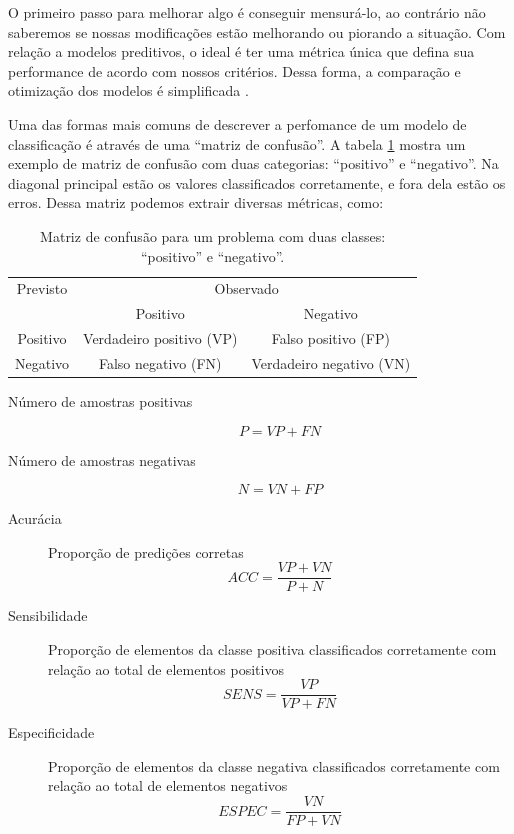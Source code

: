 \documentclass[a4paper,titlepage]{ppgi}\usepackage[]{graphicx}\usepackage[]{color}
\begin{document}
O primeiro passo para melhorar algo é conseguir mensurá-lo, ao contrário não
saberemos se nossas modificações estão melhorando ou piorando a situação. Com
relação a modelos preditivos, o ideal é ter uma métrica única que defina sua
performance de acordo com nossos critérios. Dessa forma, a comparação e
otimização dos modelos é simplificada \cite{Ng2012}.

Uma das formas mais comuns de descrever a perfomance de um modelo de
classificação é através de uma ``matriz de confusão''. A tabela
\ref{table:exemplo-matriz-de-confusao} mostra um exemplo de matriz de confusão
com duas categorias: ``positivo'' e ``negativo''. Na diagonal principal estão
os valores classificados corretamente, e fora dela estão os erros. Dessa matriz
podemos extrair diversas métricas, como:

\begin{table}
\centering
\begin{tabular}{c c c}
  Previsto & \multicolumn{2}{c}{Observado} \\  \cline{2-3}
  & \multicolumn{1}{|c}{Positivo} & \multicolumn{1}{c|}{Negativo} \\
  \hline
  \multicolumn{1}{|c|}{Positivo} & Verdadeiro positivo (VP) & \multicolumn{1}{c|}{Falso positivo (FP)} \\
  \multicolumn{1}{|c|}{Negativo} & Falso negativo (FN) & \multicolumn{1}{c|}{Verdadeiro negativo (VN)} \\
  \hline
\end{tabular}
\caption{Matriz de confusão para um problema com duas classes: ``positivo'' e
``negativo''.}
\label{table:exemplo-matriz-de-confusao}
\end{table}

\begin{description}
\item[Número de amostras positivas]
\begin{equation}
\label{eq:positive-rate}
P = VP + FN
\end{equation}
\item[Número de amostras negativas]
\begin{equation}
\label{eq:negative-rate}
N = VN + FP
\end{equation}
\item[Acurácia] Proporção de predições corretas
\begin{equation}
\label{eq:accuracy}
ACC = \frac{VP + VN}{P + N}
\end{equation}
\item[Sensibilidade] Proporção de elementos da classe positiva classificados
corretamente com relação ao total de elementos positivos
\begin{equation}
\label{eq:sensitivity}
SENS = \frac{VP}{VP + FN}
\end{equation}
\item[Especificidade] Proporção de elementos da classe negativa classificados
corretamente com relação ao total de elementos negativos
\begin{equation}
\label{eq:specificity}
ESPEC = \frac{VN}{FP + VN}
\end{equation}
\end{description}
\end{document}
